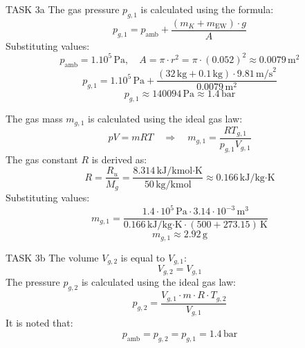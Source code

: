 TASK 3a  
The gas pressure \( p_{g,1} \) is calculated using the formula:  
\[
p_{g,1} = p_{\text{amb}} + \frac{(m_K + m_{\text{EW}}) \cdot g}{A}
\]  
Substituting values:  
\[
p_{\text{amb}} = 1.10^5 \, \text{Pa}, \quad A = \pi \cdot r^2 = \pi \cdot (0.052)^2 \approx 0.0079 \, \text{m}^2
\]  
\[
p_{g,1} = 1.10^5 \, \text{Pa} + \frac{(32 \, \text{kg} + 0.1 \, \text{kg}) \cdot 9.81 \, \text{m/s}^2}{0.0079 \, \text{m}^2}
\]  
\[
p_{g,1} \approx 140094 \, \text{Pa} \approx 1.4 \, \text{bar}
\]  

The gas mass \( m_{g,1} \) is calculated using the ideal gas law:  
\[
pV = mRT \quad \Rightarrow \quad m_{g,1} = \frac{RT_{g,1}}{p_{g,1} V_{g,1}}
\]  
The gas constant \( R \) is derived as:  
\[
R = \frac{R_u}{M_g} = \frac{8.314 \, \text{kJ/kmol·K}}{50 \, \text{kg/kmol}} \approx 0.166 \, \text{kJ/kg·K}
\]  
Substituting values:  
\[
m_{g,1} = \frac{1.4 \cdot 10^5 \, \text{Pa} \cdot 3.14 \cdot 10^{-3} \, \text{m}^3}{0.166 \, \text{kJ/kg·K} \cdot (500 + 273.15) \, \text{K}}
\]  
\[
m_{g,1} \approx 2.92 \, \text{g}
\]  

TASK 3b  
The volume \( V_{g,2} \) is equal to \( V_{g,1} \):  
\[
V_{g,2} = V_{g,1}
\]  
The pressure \( p_{g,2} \) is calculated using the ideal gas law:  
\[
p_{g,2} = \frac{V_{g,1} \cdot m \cdot R \cdot T_{g,2}}{V_{g,1}}
\]  
It is noted that:  
\[
p_{\text{amb}} = p_{g,2} = p_{g,1} = 1.4 \, \text{bar}
\]  